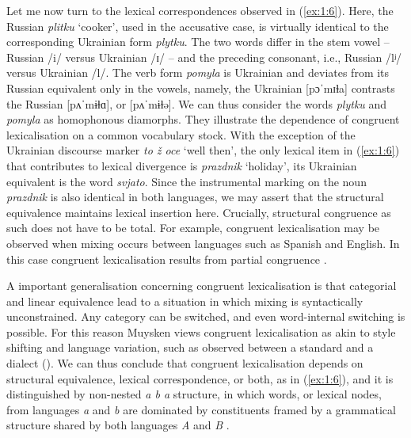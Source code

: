 Let me now turn to the lexical correspondences observed in (\ref{ex:1:6}). Here, the Russian \textit{plitku} `cooker', used in the accusative case, is virtually identical to the corresponding Ukrainian form \textit{plytku}. The two words differ in the stem vowel -- Russian /i/ versus Ukrainian /ɪ/ -- and the preceding consonant, i.e., Russian /lʲ/ versus Ukrainian /l/. The verb form \textit{pomyla} is Ukrainian and deviates from its Russian equivalent only in the vowels, namely, the Ukrainian [pɔˈmɪɫa] contrasts the Russian [pʌˈmɨɫɑ], or [pʌˈmɨɫə]. We can thus consider the words \textit{plytku} and \textit{pomyla} as homophonous diamorphs. They illustrate the dependence of congruent lexicalisation on a common vocabulary stock. With the exception of the Ukrainian discourse marker \textit{to ž oce} `well then', the only lexical item in (\ref{ex:1:6}) that contributes to lexical divergence is \textit{prazdnik} `holiday', its Ukrainian equivalent is the word \textit{svjato}. Since the instrumental marking on the noun \textit{prazdnik} is also identical in both languages, we may assert that the structural equivalence  maintains lexical insertion here. Crucially, structural congruence as such does not have to be total. For example, congruent lexicalisation may be observed when mixing occurs between languages such as Spanish and English. In this case congruent lexicalisation results from partial congruence \citep[cf.][6]{muysken-bilingual-2000}.

A important generalisation concerning congruent lexicalisation is that categorial and linear equivalence lead to a situation in which mixing is syntactically unconstrained. Any category can be switched, and even word-internal switching is possible. For this reason Muysken views congruent lexicalisation as akin to style shifting and language variation, such as observed between a standard and a dialect (\citeyear[127--128]{muysken-bilingual-2000}). We can thus conclude that congruent lexicalisation depends on structural equivalence, lexical correspondence, or both, as in (\ref{ex:1:6}), and it is distinguished by non-nested \textit{a b a} structure, in which words, or lexical nodes, from languages \textit{a} and \textit{b} are dominated by constituents framed by a grammatical structure shared by both languages \textit{A} and \textit{B} \citep[129]{muysken-bilingual-2000}.

